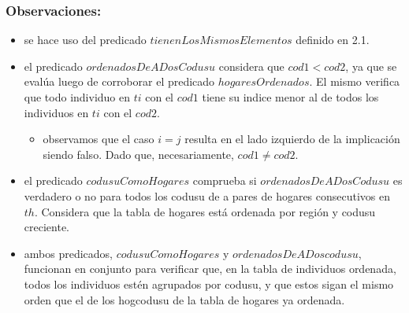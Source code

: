     \subsubsection{Observaciones:}
        \begin{itemize}
            \item se hace uso del predicado $tienenLosMismosElementos$ definido en 2.1.
            
            \item el predicado $ordenadosDeADosCodusu$ considera que $cod1 < cod2$,  ya que se evalúa luego de corroborar 
            el predicado $hogaresOrdenados$. El mismo verifica que todo individuo en $ti$ con el $cod1$ tiene 
            su indice menor al de todos los individuos en $ti$ con el $cod2$.
                \begin{itemize}
                    \item observamos que el caso $i = j$ resulta en el lado izquierdo de la implicación siendo falso. 
                    Dado que, necesariamente, $cod1 \neq cod2$.
                \end{itemize}

            \item el predicado $codusuComoHogares$ comprueba si $ordenadosDeADosCodusu$ es verdadero o no para todos los 
            codusu de a pares de hogares consecutivos en $th$. Considera que la tabla de hogares está ordenada por regi\'on 
            y codusu creciente.
            
            \item ambos predicados, $codusuComoHogares$ y $ordenadosDeADoscodusu$, funcionan en conjunto para verificar que, 
            en la tabla de individuos ordenada, todos los individuos est\'en agrupados por codusu, 
            y que estos sigan el mismo orden que el de los hogcodusu de la tabla de hogares ya ordenada.
        \end{itemize}
